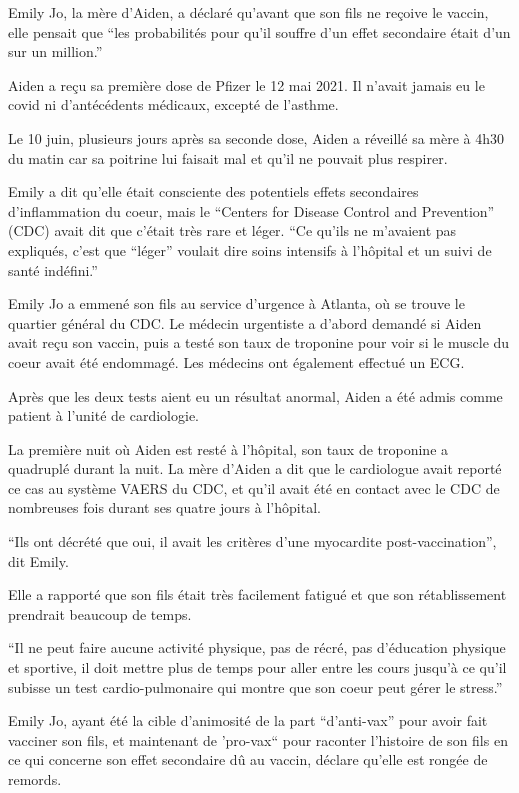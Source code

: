 \normalsize 

Emily Jo, la mère d'Aiden, a déclaré qu'avant que son fils ne reçoive le vaccin,
elle pensait que “les probabilités pour qu'il souffre d'un effet secondaire
était d'un sur un million.”

Aiden a reçu sa première dose de Pfizer le 12 mai 2021. Il n'avait jamais eu le
covid ni d'antécédents médicaux, excepté de l'asthme.

Le 10 juin, plusieurs jours après sa seconde dose, Aiden a réveillé sa mère à
4h30 du matin car sa poitrine lui faisait mal et qu'il ne pouvait plus respirer.

Emily a dit qu'elle était consciente des potentiels effets secondaires
d'inflammation du coeur, mais le “Centers for Disease Control and Prevention”
(CDC) avait dit que c'était très rare et léger. “Ce qu'ils ne m'avaient pas
expliqués, c'est que “léger” voulait dire soins intensifs à l'hôpital et un
suivi de santé indéfini.”

Emily Jo a emmené son fils au service d'urgence à Atlanta, où se trouve le
quartier général du CDC. Le médecin urgentiste a d'abord demandé si Aiden avait
reçu son vaccin, puis a testé son taux de troponine pour voir si le muscle du
coeur avait été endommagé. Les médecins ont également effectué un ECG.

Après que les deux tests aient eu un résultat anormal, Aiden a été admis comme
patient à l'unité de cardiologie.

La première nuit où Aiden est resté à l'hôpital, son taux de troponine a
quadruplé durant la nuit. La mère d'Aiden a dit que le cardiologue avait reporté
ce cas au système VAERS du CDC, et qu'il avait été en contact avec le CDC de
nombreuses fois durant ses quatre jours à l'hôpital.

“Ils ont décrété que oui, il avait les critères d'une myocardite
post-vaccination”, dit Emily.

Elle a rapporté que son fils était très facilement fatigué et que son
rétablissement prendrait beaucoup de temps.

“Il ne peut faire aucune activité physique, pas de récré, pas d'éducation
physique et sportive, il doit mettre plus de temps pour aller entre les cours
jusqu'à ce qu'il subisse un test cardio-pulmonaire qui montre que son coeur peut
gérer le stress.”

Emily Jo, ayant été la cible d'animosité de la part “d'anti-vax” pour avoir fait
vacciner son fils, et maintenant de 'pro-vax“ pour raconter l'histoire de son
fils en ce qui concerne son effet secondaire dû au vaccin, déclare qu'elle est
rongée de remords.

